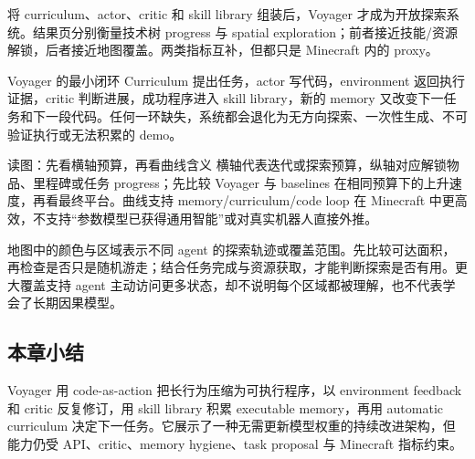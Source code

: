 将 curriculum、actor、critic 和 skill library 组装后，Voyager 才成为开放探索系统。结果页分别衡量技术树 progress 与 spatial exploration；前者接近技能/资源解锁，后者接近地图覆盖。两类指标互补，但都只是 Minecraft 内的 proxy。


\begin{importantbox}{Voyager 的最小闭环}
Curriculum 提出任务，actor 写代码，environment 返回执行证据，critic 判断进展，成功程序进入 skill library，新的 memory 又改变下一任务和下一段代码。任何一环缺失，系统都会退化为无方向探索、一次性生成、不可验证执行或无法积累的 demo。
\end{importantbox}


\begin{knowledgebox}{读图：先看横轴预算，再看曲线含义}
横轴代表迭代或探索预算，纵轴对应解锁物品、里程碑或任务 progress；先比较 Voyager 与 baselines 在相同预算下的上升速度，再看最终平台。曲线支持 memory/curriculum/code loop 在 Minecraft 中更高效，不支持“参数模型已获得通用智能”或对真实机器人直接外推。
\end{knowledgebox}


地图中的颜色与区域表示不同 agent 的探索轨迹或覆盖范围。先比较可达面积，再检查是否只是随机游走；结合任务完成与资源获取，才能判断探索是否有用。更大覆盖支持 agent 主动访问更多状态，却不说明每个区域都被理解，也不代表学会了长期因果模型。


\subsection{本章小结}

Voyager 用 code-as-action 把长行为压缩为可执行程序，以 environment feedback 和 critic 反复修订，用 skill library 积累 executable memory，再用 automatic curriculum 决定下一任务。它展示了一种无需更新模型权重的持续改进架构，但能力仍受 API、critic、memory hygiene、task proposal 与 Minecraft 指标约束。

